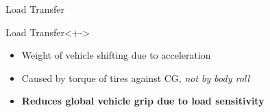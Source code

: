 \documentclass[aspectratio=169]{beamer}
\begin{document}
\begin{frame}{Load Transfer}
        \begin{block}{Load Transfer}<+->
            \begin{itemize}
                \item<+-> Weight of vehicle shifting due to acceleration
                \item<+-> Caused by torque of tires against CG, \textit{not by body roll}
            \end{itemize}
        \end{block}

        \begin{itemize}
            \item<+-> \textbf{Reduces global vehicle grip due to load sensitivity}
        \end{itemize}
\end{frame}
\end{document}
